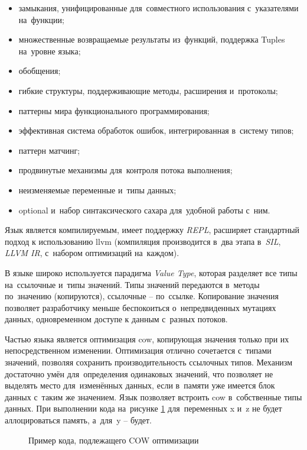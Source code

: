 \begin{itemize}
	\item замыкания, унифицированные для~совместного использования с~указателями на~функции;
	\item множественные возвращаемые результаты из~функций, поддержка Tuples на~уровне языка;
	\item обобщения;
	\item гибкие структуры, поддерживающие методы, расширения и~протоколы;
	\item паттерны мира функционального программирования;
	\item эффективная система обработок ошибок, интегрированная в~систему типов;
	\item паттерн матчинг;
	\item продвинутые механизмы для~контроля потока выполнения;
	\item неизменяемые переменные и~типы данных;
	\item optional и~набор синтаксического сахара для~удобной работы с~ним.
\end{itemize}

Язык является компилируемым, имеет поддержку \textit{REPL}, расширяет стандартный подход к использованию \gls{llvm} (компиляция производится в~два этапа в~\textit{SIL}, \textit{LLVM IR}, с~набором оптимизаций на~каждом).

В языке широко используется парадигма \textit{Value Type}, которая разделяет все типы на~ссылочные и~типы значений. Типы значений передаются в~методы по~значению (копируются), ссылочные -- по~ссылке. Копирование значения позволяет разработчику меньше беспокоиться о~непредвиденных мутациях данных, одновременном доступе к данным с~разных потоков.

Частью языка является оптимизация \gls{cow}, копирующая значения только при их непосредственном изменении. Оптимизация отлично сочетается с~типами значений, позволяя сохранить производительность ссылочных типов. Механизм достаточно умён для~определения одинаковых значений, что позволяет не выделять место для~изменённых данных, если в~памяти уже имеется блок данных с~таким же значением. Язык позволяет встроить \gls{cow} в~собственные типы данных. При выполнении кода на~рисунке \ref{sec:development:arch:ios:swift:code:cow} для~переменных x и~z не будет аллоцироваться память, а~для~y -- будет.

\begin{figure}[h]
	
   \caption{Пример кода, подлежащего COW оптимизации}
   \label{sec:development:arch:ios:swift:code:cow}
\end{figure}

